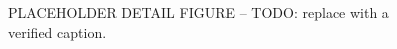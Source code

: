 \begin{figure}[t]
  \centering
  \caption{PLACEHOLDER DETAIL FIGURE -- TODO: replace with a verified caption.}
  \label{fig:placeholder-detail}
\end{figure}
